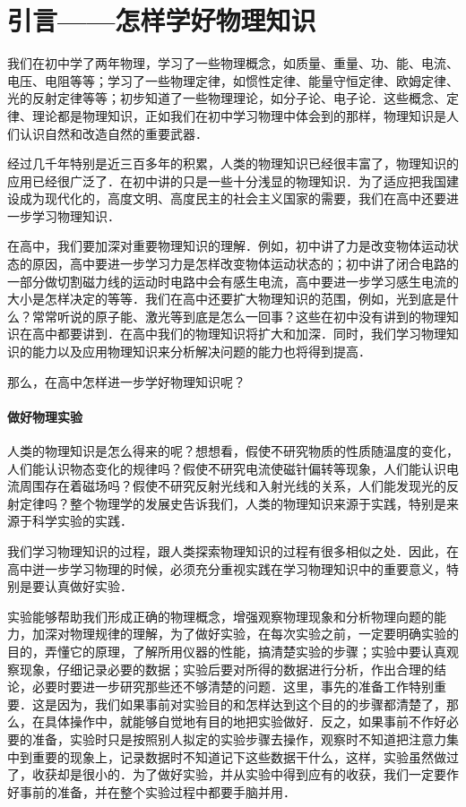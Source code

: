 
\chapter{引言——怎样学好物理知识}

\label{foreword}

我们在初中学了两年物理，学习了一些物理概念，如质量、重量、功、能、电流、电压、电阻等等；学习了一些物理定律，如惯性定律、能量守恒定律、欧姆定律、光的反射定律等等；初步知道了一些物理理论，如分子论、电子论．这些概念、定律、理论都是物理知识，正如我们在初中学习物理中体会到的那样，物理知识是人们认识自然和改造自然的重要武器．

经过几千年特别是近三百多年的积累，人类的物理知识已经很丰富了，物理知识的应用已经很广泛了．在初中讲的只是一些十分浅显的物理知识．为了适应把我国建设成为现代化的，高度文明、高度民主的社会主义国家的需要，我们在高中还要进一步学习物理知识．

在高中，我们要加深对重要物理知识的理解．例如，初中讲了力是改变物体运动状态的原因，高中要进一步学习力是怎样改变物体运动状态的；初中讲了闭合电路的一部分做切割磁力线的运动时电路中会有感生电流，高中要进一步学习感生电流的大小是怎样决定的等等．我们在高中还要扩大物理知识的范围，例如，光到底是什么？常常听说的原子能、激光等到底是怎么一回事？这些在初中没有讲到的物理知识在高中都要讲到．在高中我们的物理知识将扩大和加深．同时，我们学习物理知识的能力以及应用物理知识来分析解决问题的能力也将得到提高．

那么，在高中怎样进一步学好物理知识呢？



\subsubsection*{做好物理实验}
人类的物理知识是怎么得来的呢？想想看，假使不研究物质的性质随温度的变化，人们能认识物态变化的规律吗？假使不研究电流使磁针偏转等现象，人们能认识电流周围存在着磁场吗？假使不研究反射光线和入射光线的关系，人们能发现光的反射定律吗？整个物理学的发展史告诉我们，人类的物理知识来源于实践，特别是来源于科学实验的实践．

我们学习物理知识的过程，跟人类探索物理知识的过程有很多相似之处．因此，在高中迸一步学习物理的时候，必须充分重视实践在学习物理知识中的重要意义，特别是要认真做好实验．

实验能够帮助我们形成正确的物理概念，增强观察物理现象和分析物理向题的能力，加深对物理规律的理解，为了做好实验，在每次实验之前，一定要明确实验的目的，弄懂它的原理，了解所用仪器的性能，搞清楚实验的步骤；实验中要认真观察现象，仔细记录必要的数据；实验后要对所得的数据进行分析，作出合理的结论，必要时要进一步研究那些还不够清楚的问题．这里，事先的准备工作特别重要．这是因为，我们如果事前对实验目的和怎样达到这个目的的步骤都清楚了，那么，在具体操作中，就能够自觉地有目的地把实验做好．反之，如果事前不作好必要的准备，实验时只是按照别人拟定的实验步骤去操作，观察时不知道把注意力集中到重要的现象上，记录数据时不知道记下这些数据干什么，这样，实验虽然做过了，收获却是很小的．为了做好实验，并从实验中得到应有的收获，我们一定要作好事前的准备，并在整个实验过程中都要手脑并用．

